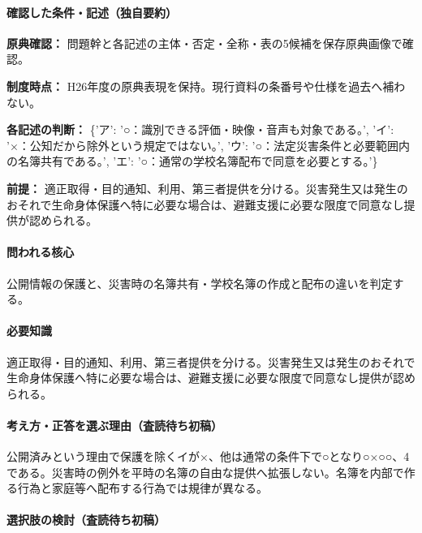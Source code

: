 \paragraph{確認した条件・記述（独自要約）}\mbox{}\par

\noindent\textbf{原典確認：} 問題幹と各記述の主体・否定・全称・表の5候補を保存原典画像で確認。\par

\noindent\textbf{制度時点：} H26年度の原典表現を保持。現行資料の条番号や仕様を過去へ補わない。\par

\noindent\textbf{各記述の判断：} \{'ア': '○：識別できる評価・映像・音声も対象である。', 'イ': '×：公知だから除外という規定ではない。', 'ウ': '○：法定災害条件と必要範囲内の名簿共有である。', 'エ': '○：通常の学校名簿配布で同意を必要とする。'\}\par

\noindent\textbf{前提：} 適正取得・目的通知、利用、第三者提供を分ける。災害発生又は発生のおそれで生命身体保護へ特に必要な場合は、避難支援に必要な限度で同意なし提供が認められる。\par

\paragraph{問われる核心} 公開情報の保護と、災害時の名簿共有・学校名簿の作成と配布の違いを判定する。

\paragraph{必要知識} 適正取得・目的通知、利用、第三者提供を分ける。災害発生又は発生のおそれで生命身体保護へ特に必要な場合は、避難支援に必要な限度で同意なし提供が認められる。

\paragraph{考え方・正答を選ぶ理由（査読待ち初稿）} 公開済みという理由で保護を除くイが×、他は通常の条件下で○となり○×○○、4である。災害時の例外を平時の名簿の自由な提供へ拡張しない。名簿を内部で作る行為と家庭等へ配布する行為では規律が異なる。

\paragraph{選択肢の検討（査読待ち初稿）}\mbox{}\par

